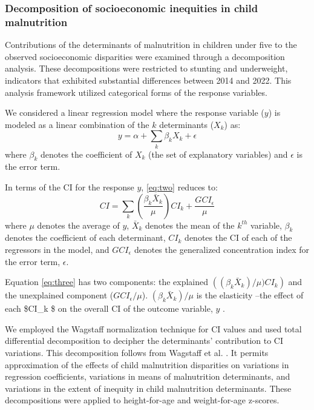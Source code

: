 \documentclass[sn-basic,Numbered,pdflatex]{sn-jnl}
\theoremstyle{remark}
\theoremstyle{definition}
\begin{document}
\hypertarget{decompose}{%
\subsubsection{Decomposition of socioeconomic inequities in child
malnutrition}\label{decompose}}

Contributions of the determinants of malnutrition in children under five
to the observed socioeconomic disparities were examined through a
decomposition analysis. These decompositions were restricted to stunting
and underweight, indicators that exhibited substantial differences
between 2014 and 2022. This analysis framework utilized categorical
forms of the response variables.

We considered a linear regression model where the response variable
(\(y\)) is modeled as a linear combination of the \(k\) determinants
(\(X_k\)) as: \begin{equation}
y = \alpha + \sum_{k} \beta_k X_k + \epsilon
\label{eq:two}
\end{equation} where \(\beta_k\) denotes the coefficient of \(X_k\) (the
set of explanatory variables) and \(\epsilon\) is the error term.

In terms of the CI for the response \(y\), \ref{eq:two} reduces to:
\begin{equation}
CI = \sum_{k} \left( \frac{\beta_k \bar{X}_k}{\mu} \right) CI_k + \frac{G CI_{\epsilon}}{\mu}
\label{eq:three}
\end{equation} where \(\mu\) denotes the average of \(y\), \(\bar{X}_k\)
denotes the mean of the \(k^{th}\) variable, \(\beta_k\) denotes the
coefficient of each determinant, \(CI_k\) denotes the CI of each of the
regressors in the model, and \(G CI_\epsilon\) denotes the generalized
concentration index for the error term, \(\epsilon\).

Equation \ref{eq:three} has two components: the explained
\(\left( (\beta_k \bar{X}_k)/ \mu)CI_k\right)\) and the unexplained
component (\(GCI_{\epsilon}/ \mu\)). \((\beta_k \bar{X}_k)/\mu\) is the
elasticity --the effect of each \$CI\_k \$ on the overall CI of the
outcome variable, \(y\) \citep{Wagstaff2000, Wagstaff2003}.

We employed the Wagstaff normalization technique for CI values and used
total differential decomposition to decipher the determinants'
contribution to CI variations. This decomposition follows from Wagstaff
et al. \citep{Wagstaff2003}. It permits approximation of the effects of
child malnutrition disparities on variations in regression coefficients,
variations in means of malnutrition determinants, and variations in the
extent of inequity in child malnutrition determinants. These
decompositions were applied to height-for-age and weight-for-age
z-scores.
\end{document}
